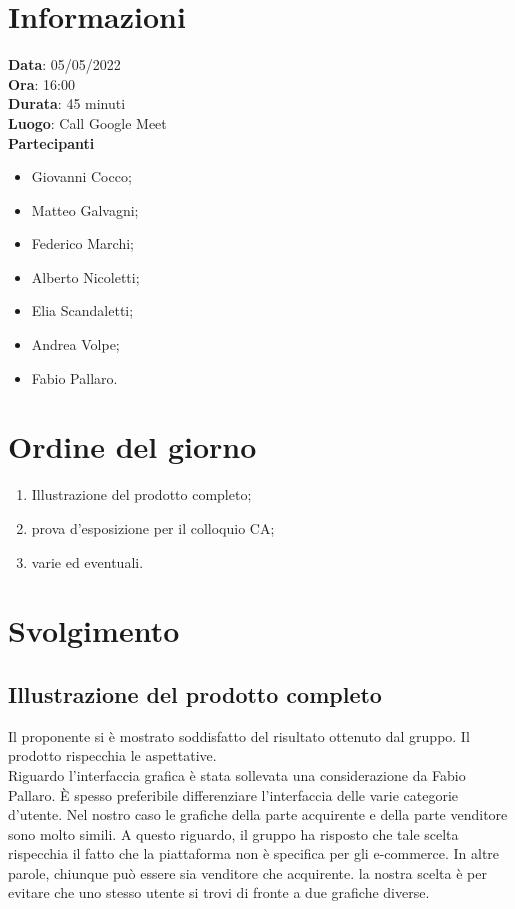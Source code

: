\documentclass[a4paper, 12pt]{article}
\begin{document}
\makefrontpage

\section{Informazioni}
\textbf{Data}: 05/05/2022\\
\textbf{Ora}: 16:00\\
\textbf{Durata}: 45 minuti\\
\textbf{Luogo}: Call Google Meet\\

\textbf{Partecipanti}
\begin{itemize}
	\item Giovanni Cocco;
	\item Matteo Galvagni;
	\item Federico Marchi;
	\item Alberto Nicoletti;
	\item Elia Scandaletti;
	\item Andrea Volpe;
	\item Fabio Pallaro.
\end{itemize}


\section{Ordine del giorno}
\begin{enumerate}
	\item Illustrazione del prodotto completo;
	\item prova d'esposizione per il colloquio CA;
 	\item varie ed eventuali.
\end{enumerate}

\section{Svolgimento}
\subsection{Illustrazione del prodotto completo}
Il proponente si è mostrato soddisfatto del risultato ottenuto dal gruppo. Il prodotto rispecchia le aspettative. \\
Riguardo l'interfaccia grafica è stata sollevata una considerazione da Fabio Pallaro. \`E spesso preferibile differenziare l'interfaccia delle varie categorie d'utente. Nel nostro caso le grafiche della parte acquirente e della parte venditore sono molto simili.
A questo riguardo, il gruppo ha risposto che tale scelta rispecchia il fatto che la piattaforma non è specifica per gli e-commerce. In altre parole, chiunque può essere sia venditore che acquirente. la nostra scelta è per evitare che uno stesso utente si trovi di fronte a due grafiche diverse.
\end{document}
